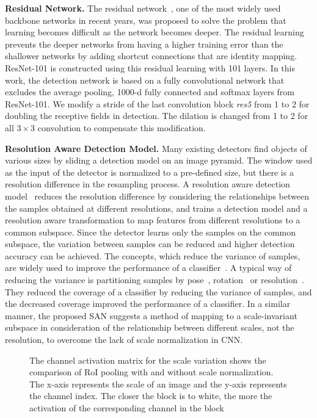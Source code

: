 \documentclass[runningheads]{llncs}
\begin{document}
\noindent
\textbf{Residual Network.}
The residual network~\cite{he2016deep}, one of the most widely used backbone networks in recent years, was proposed to solve the problem that learning becomes difficult as the network becomes deeper.
The residual learning prevents the deeper networks from having a higher training error than the shallower networks by adding shortcut connections that are identity mapping.
ResNet-101 is constructed using this residual learning with 101 layers.
In this work, the detection network is based on a fully convolutional network that excludes the average pooling, 1000-d fully connected and softmax layers from ResNet-101.
We modify a stride of the last convolution block \textit{res5} from 1 to 2 for doubling the receptive fields in detection.
The dilation is changed from 1 to 2 for all $3\times3$ convolution to compensate this modification.


\noindent
\textbf{Resolution Aware Detection Model.}
Many existing detectors find objects of various sizes by sliding a detection model on an image pyramid.
The window used as the input of the detector is normalized to a pre-defined size, but there is a resolution difference in the resampling process.
A resolution aware detection model~\cite{yan2013robust} reduces the resolution difference by considering the relationships between the samples obtained at different resolutions, and trains a detection model and a resolution aware transformation to map features from different resolutions to a common subspace.
Since the detector learns only the samples on the common subspace, the variation between samples can be reduced and higher detection accuracy can be achieved.
The concepts, which reduce the variance of samples, are widely used to improve the performance of a classifier~\cite{geman1992neural,james2013introduction}.
A typical way of reducing the variance is partitioning samples by pose~\cite{huang2005vector,jones2003fast,wu2004fast}, rotation~\cite{yang2013articulated} or resolution~\cite{park2010multiresolution,yan2013robust}.
They reduced the coverage of a classifier by reducing the variance of samples, and the decreased coverage improved the performance of a classifier.
In a similar manner, the proposed SAN suggests a method of mapping to a scale-invariant subspace in consideration of the relationship between different scales, not the resolution, to overcome the lack of scale normalization in CNN.
\\


\begin{figure}[t]
	\centering
	\caption{
		The channel activation matrix for the scale variation shows the comparison of RoI pooling with and without scale normalization.
		The x-axis represents the scale of an image and the y-axis represents the channel index.
		The closer the block is to white, the more the activation of the corresponding channel in the block
	}
	\label{fig:SAN_MOTIVE}
\end{figure}
\end{document}

